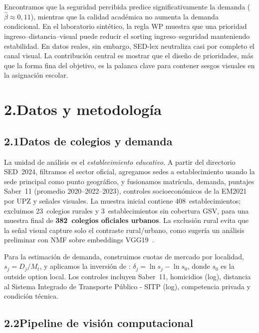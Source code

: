 \documentclass[12pt,a4paper]{article}
\begin{document}
Encontramos que la seguridad percibida predice significativamente la demanda
($\hat{\beta}\approx0{,}11$), mientras que la calidad académica no aumenta la
demanda condicional. En el laboratorio sintético, la regla WP muestra que una
prioridad ingreso--distancia--visual puede reducir el sorting ingreso--seguridad
manteniendo estabilidad. En datos reales, sin embargo, SED-lex neutraliza casi
por completo el canal visual. La contribución central es mostrar que el diseño
de prioridades, más que la forma fina del objetivo, es la palanca clave para
contener sesgos visuales en la asignación escolar.


\section*{2.\quad Datos y metodología}

\subsection*{2.1\quad Datos de colegios y demanda}

La unidad de análisis es el \emph{establecimiento educativo}. A partir del
directorio SED~2024, filtramos el sector oficial, agregamos sedes a
establecimiento usando la sede principal como punto geográfico, y fusionamos
matrícula, demanda, puntajes Saber~11 (promedio 2020--2022--2023), controles
socioeconómicos de la EM2021 por UPZ y señales visuales. La muestra inicial
contiene 408~establecimientos; excluimos 23~colegios rurales y
3~establecimientos sin cobertura GSV, para una muestra final de
\textbf{382~colegios oficiales urbanos}. La exclusión rural evita que la señal
visual capture solo el contraste rural/urbano, como sugería un análisis
preliminar con NMF sobre embeddings VGG19~\citep{Simonyan2015}.

Para la estimación de demanda, construimos cuotas de mercado por localidad,
$s_j=D_j/M_t$, y aplicamos la inversión de \citet{Berry1994}:
$\delta_j=\ln s_j-\ln s_0$, donde $s_0$ es la outside option local. Los controles
incluyen Saber~11, homicidios (log), distancia al Sistema Integrado de Transporte Público - SITP (log), competencia privada
y condición técnica.

\subsection*{2.2\quad Pipeline de visión computacional}
\end{document}
